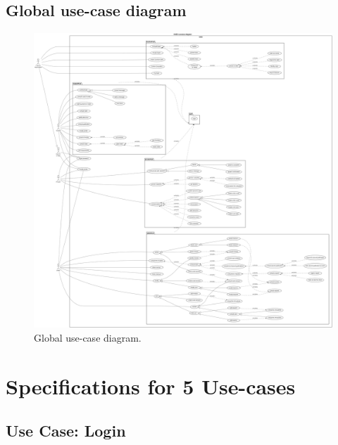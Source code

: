 \documentclass[]{uc2pfecaneva}
\begin{document}
\subsection{Global use-case diagram}

     \begin{figure}[ht]
	
	\centering
	\includegraphics[width=\textwidth]{images/GUCD}
	
	\caption{Global use-case diagram.}
	\end{figure}
\clearpage

\raggedright\section{Specifications for 5 Use-cases}

\raggedright\subsection{Use Case: Login}
\end{document}
